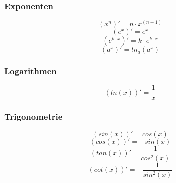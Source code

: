 \subsubsection{Exponenten}
\[ \boxed{ (x^n)' = n\cdot x^{(n-1)} } \]
\[ \boxed{ (e^x)' = e^x } \]
\[ \boxed{ (e^{k\cdot x})' = k \cdot e^{k\cdot x} } \]
\[ \boxed{ (a^x)' = ln_a (a^x) } \]

\subsubsection{Logarithmen}
\[ \boxed{ (ln(x))' = \frac{1}{x} } \]  

\subsubsection{Trigonometrie}
\[ \boxed{ (sin(x))' = cos(x) } \]  
\[ \boxed{ (cos(x))' = -sin(x) } \] 
\[ \boxed{ (tan(x))' = \frac{1}{cos^2(x)} } \]  
\[ \boxed{ (cot(x))' = -\frac{1}{sin^2(x)} } \]
